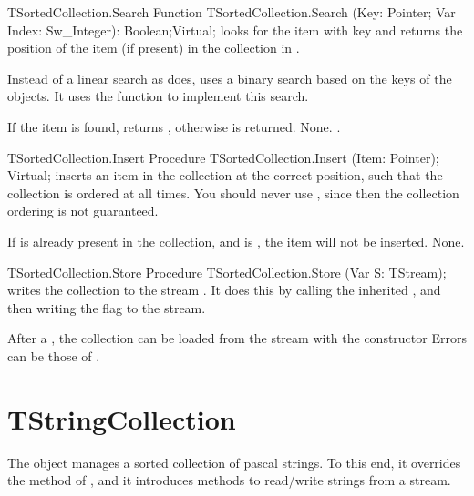 \begin{function}{TSortedCollection.Search}
\Declaration
Function TSortedCollection.Search (Key: Pointer; Var Index: Sw\_Integer): Boolean;Virtual;
\Description
{} looks for the item with key  and returns the position 
of the item (if present) in the collection in .

Instead of a linear search as  does, 
uses a binary search based on the keys of the objects. It uses the
 function to implement this
search. 

If the item is found,  returns , otherwise 
is returned.
\Errors
None.
\SeeAlso
{}.
\end{function}

\begin{procedure}{TSortedCollection.Insert}
\Declaration
Procedure TSortedCollection.Insert (Item: Pointer); Virtual;
\Description
{} inserts an item in the collection at the correct position, such
that the collection is ordered at all times. You should never use
, since then the collection ordering
is not guaranteed.

If  is already present in the collection, and  is
, the item will not be inserted.
\Errors
None.
\SeeAlso
{}
\end{procedure}

\begin{procedure}{TSortedCollection.Store}
\Declaration
Procedure TSortedCollection.Store (Var S: TStream);
\Description
{} writes the collection to the stream . It does this by
calling the inherited , and then writing the
 flag to the stream.

After a , the collection can be loaded from the stream with the 
constructor 
\Errors
Errors can be those of .
\SeeAlso
{}
\end{procedure}

\section{TStringCollection}
\label{se:TStringCollection}

The  object manages a sorted collection of pascal 
strings. 
To this end, it overrides the 
method of , and it introduces methods to read/write
strings from a stream.

